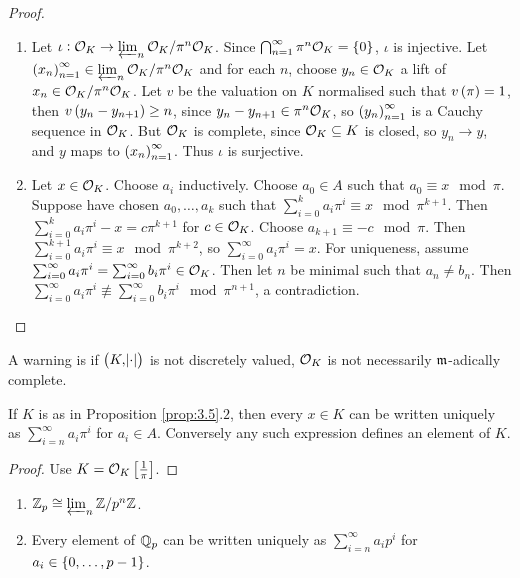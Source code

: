 \begin{proof}
\hfill
\begin{enumerate}
\item Let $ \iota : \mathcal{O}_K \to \varprojlim_n \mathcal{O}_K / \pi^n\mathcal{O}_K $. Since $ \bigcap_{n = 1}^\infty \pi^n\OOO_K = \cbr{0} $, $ \iota $ is injective. Let $ \br{x_n}_{n = 1}^\infty \in \varprojlim_n \OOO_K / \pi^n\OOO_K $ and for each $ n $, choose $ y_n \in \mathcal{O}_K $ a lift of $ x_n \in \mathcal{O}_K / \pi^n\mathcal{O}_K $. Let $ v $ be the valuation on $ K $ normalised such that $ v\br{\pi} = 1 $, then $ v\br{y_n - y_{n + 1}} \ge n $, since $ y_n - y_{n + 1} \in \pi^n\mathcal{O}_K $, so $ \br{y_n}_{n = 1}^\infty $ is a Cauchy sequence in $ \mathcal{O}_K $. But $ \mathcal{O}_K $ is complete, since $ \mathcal{O}_K \subseteq K $ is closed, so $ y_n \to y $, and $ y $ maps to $ \br{x_n}_{n = 1}^\infty $. Thus $ \iota $ is surjective.
\item Let $ x \in \mathcal{O}_K $. Choose $ a_i $ inductively. Choose $ a_0 \in A $ such that $ a_0 \equiv x \mod \pi $. Suppose have chosen $ a_0, \dots, a_k $ such that $ \sum_{i = 0}^k a_i\pi^i \equiv x \mod \pi^{k + 1} $. Then $ \sum_{i = 0}^k a_i\pi^i - x = c\pi^{k + 1} $ for $ c \in \mathcal{O}_K $. Choose $ a_{k + 1} \equiv -c \mod \pi $. Then $ \sum_{i = 0}^{k + 1} a_i\pi^i \equiv x \mod \pi^{k + 2} $, so $ \sum_{i = 0}^\infty a_i\pi^i = x $. For uniqueness, assume $ \sum_{i = 0}^\infty a_i\pi^i = \sum_{i = 0}^\infty b_i\pi^i \in \mathcal{O}_K $. Then let $ n $ be minimal such that $ a_n \ne b_n $. Then $ \sum_{i = 0}^\infty a_i\pi^i \not\equiv \sum_{i = 0}^\infty b_i\pi^i \mod \pi^{n + 1} $, a contradiction.
\end{enumerate}
\end{proof}

A warning is if $ \br{K, \abs{\cdot}} $ is not discretely valued, $ \mathcal{O}_K $ is not necessarily $ \mathfrak{m} $-adically complete.

\begin{corollary}
\label{cor:3.6}
If $ K $ is as in Proposition \ref{prop:3.5}.$ 2 $, then every $ x \in K $ can be written uniquely as $ \sum_{i = n}^\infty a_i\pi^i $ for $ a_i \in A $. Conversely any such expression defines an element of $ K $.
\end{corollary}

\begin{proof}
Use $ K = \OOO_K\sbr{\tfrac{1}{\pi}} $.
\end{proof}

\begin{corollary}
\hfill
\begin{enumerate}
\item $ \mathbb{Z}_p \cong \varprojlim_n \mathbb{Z} / p^n\mathbb{Z} $.
\item Every element of $ \mathbb{Q}_p $ can be written uniquely as $ \sum_{i = n}^\infty a_ip^i $ for $ a_i \in \cbr{0, \dots, p - 1} $.
\end{enumerate}
\end{corollary}

